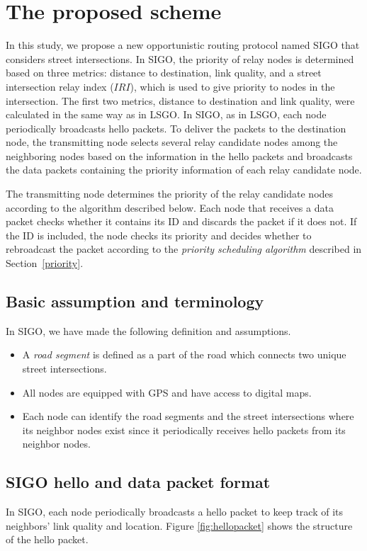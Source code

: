\documentclass[conference]{IEEEtran}
\begin{document}
\section{The proposed scheme}
\label{SIGO}
In this study, we propose a new opportunistic routing protocol named SIGO that considers street intersections. 
In SIGO, the priority of relay nodes is determined based on three metrics: distance to destination, link quality, and a street intersection relay index ($IRI$), which is used to give priority to nodes in the intersection.
The first two metrics, distance to destination and link quality, were calculated in the same way as in LSGO. 
In SIGO, as in LSGO, each node periodically broadcasts hello packets. To deliver the packets to the destination node, the transmitting node selects several relay candidate nodes among the neighboring nodes based on the information in the hello packets and broadcasts the data packets containing the priority information of each relay candidate node.

The transmitting node determines the priority of the relay candidate nodes according to the algorithm described 
below. Each node that receives a data packet checks whether it contains its ID and discards the packet if it does not. If the ID is included, the node checks its priority and decides whether to rebroadcast the packet according to the \textit{priority scheduling algorithm} described in \mbox{Section \ref{priority}}.

\subsection{Basic assumption and terminology}
In SIGO, we have made the following definition and assumptions.
\begin{itemize}
\item A \textit{road segment} is defined as a part of the road which connects two unique street intersections.
\item All nodes are equipped with GPS and have access to digital maps.
\item Each node can identify the road segments and the street intersections where its neighbor nodes exist since it
periodically receives hello packets from its neighbor nodes.
\end{itemize}


\subsection{SIGO hello and data packet format}
In SIGO, each node periodically broadcasts a hello packet to keep track of its neighbors' link quality and location.  Figure \ref{fig:hellopacket} shows the structure of the hello packet.
\end{document}
